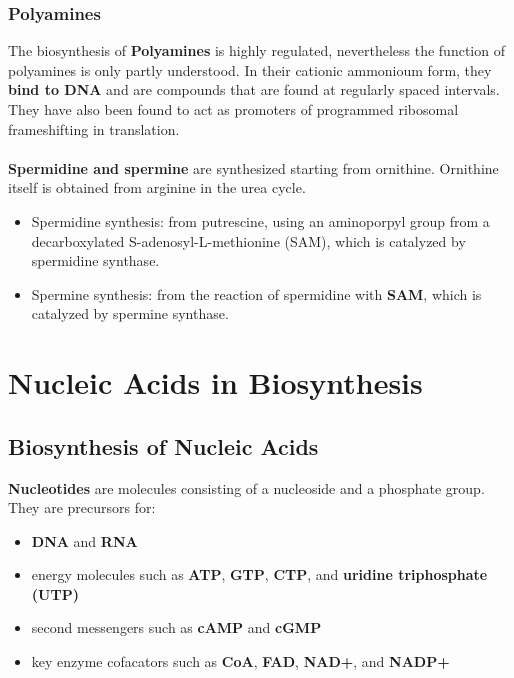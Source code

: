 \documentclass[../main.tex]{subfiles}
\begin{document}
\subsubsection{Polyamines}

The biosynthesis of \textbf{\gls{Polyamines}} is highly regulated, nevertheless the function of polyamines is only partly understood. In their cationic ammonioum form, they \textbf{bind to DNA} and are compounds that are found at regularly spaced intervals. They have also been found to act as promoters of programmed ribosomal frameshifting in translation. \\
\\
\textbf{Spermidine and spermine} are synthesized starting from ornithine. Ornithine itself is obtained from arginine in the urea cycle. 
\begin{itemize}
	\item Spermidine synthesis: from putrescine, using an aminoporpyl group from a decarboxylated S-adenosyl-L-methionine (SAM), which is catalyzed by spermidine synthase.
	\item Spermine synthesis: from the reaction of spermidine with \textbf{SAM}, which is catalyzed by spermine synthase.
\end{itemize} 


\section{Nucleic Acids in Biosynthesis}

\subsection{Biosynthesis of Nucleic Acids}

\textbf{\gls{Nucleotides}} are molecules consisting of a nucleoside and a phosphate group. They are precursors for:
\begin{itemize}
	\item \textbf{\gls{DNA}} and \textbf{\gls{RNA}}
	\item energy molecules such as \textbf{\gls{ATP}}, \textbf{\gls{GTP}}, \textbf{\gls{CTP}}, and \textbf{\gls{uridine triphosphate (UTP)}} 
	\item second messengers such as \textbf{\gls{cAMP}} and \textbf{\gls{cGMP}}
	\item key enzyme cofacators such as \textbf{\gls{CoA}}, \textbf{\gls{FAD}}, \textbf{\gls{NAD+}}, and \textbf{\gls{NADP+}}
\end{itemize}
\end{document}
